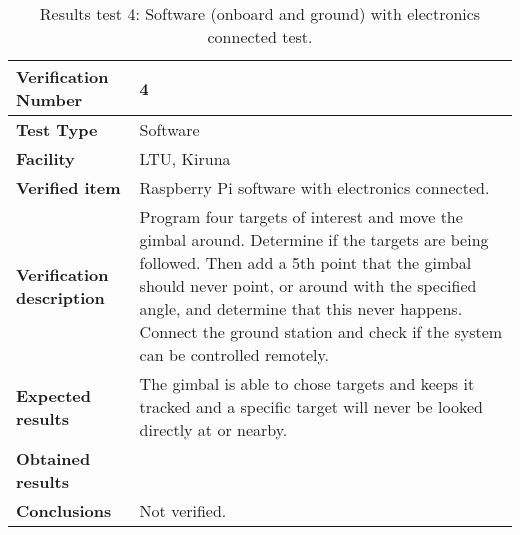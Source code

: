 \begin{table}[H]
\centering

\begin{tabular}{|m{}| m{} |}
\hline
\textbf{Verification Number} 		& 4 				\\ \hline
\textbf{Test Type} 					& Software 			\\ \hline
\textbf{Facility} 					& LTU, Kiruna 		\\ \hline
\textbf{Verified item} 				& Raspberry Pi software with electronics connected. 	\\ \hline

\textbf{Verification description} 	& Program four targets of interest and move the gimbal around. Determine if the targets are being followed. Then add a 5th point that the gimbal should never point, or around with the specified angle, and determine that this never happens. Connect the ground station and check if the system can be controlled remotely. \\ \hline

\textbf{Expected results} 			& The gimbal is able to chose targets and keeps it tracked and a specific target will never be looked directly at or nearby. \\ \hline

\textbf{Obtained results} 			& \\ \hline

\textbf{Conclusions} 				& Not verified.		\\ \hline
\end{tabular}
\caption{Results test 4: Software (onboard and ground) with electronics connected test.}
\label{tab:testresult4:software}
\end{table}


\raggedbottom